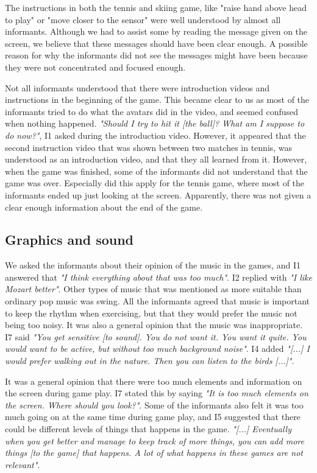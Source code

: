 The instructions in both the tennis and skiing game, like "raise hand above head to play" or "move closer to the sensor" were well understood by almost all informants. Although we had to assist some by reading the message given on the screen, we believe that these messages should have been clear enough. A possible reason for why the informants did not see the messages might have been because they were not concentrated and focused enough. 

Not all informants understood that there were introduction videos and instructions in the beginning of the game. This became clear to us as most of the informants tried to do what the avatars did in the video, and seemed confused when nothing happened. \emph{"Should I try to hit it [the ball]? What am I suppose to do now?"}, I1 asked during the introduction video. However, it appeared that the second instruction video that was shown between two matches in tennis, was understood as an introduction video, and that they all learned from it. However, when the game was finished, some of the informants did not understand that the game was over. Especially did this apply for the tennis game, where most of the informants ended up just looking at the screen. Apparently, there was not given a clear enough information about the end of the game.  

\subsection{Graphics and sound}

We asked the informants about their opinion of the music in the games, and I1 answered that \emph{"I think everything about that was too much"}. I2 replied with \emph{"I like Mozart better"}. Other types of music that was mentioned as more suitable than ordinary pop music was swing. All the informants agreed that music is important to keep the rhythm when exercising, but that they would prefer the music not being too noisy. It was also a general opinion that the music was inappropriate.  I7 said \emph{"You get sensitive [to sound]. You do not want it. You want it quite. You would want to be active, but without too much background noise"}. I4 added \emph{"[...] I would prefer walking out in the nature. Then you can listen to the birds [...]"}.

It was a general opinion that there were too much elements and information on the screen during game play. I7 stated this by saying \emph{"It is too much elements on the screen. Where should you look?"}. Some of the informants also felt it was too much going on at the same time during game play, and I5 suggested that there could be different levels of things that happens in the game. \emph{"[...] Eventually when you get better and manage to keep track of more things, you can add more things [to the game] that happens. A lot of what happens in these games are not relevant"}. 

